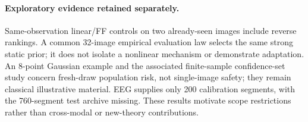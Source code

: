 \paragraph{Exploratory evidence retained separately.} Same-observation linear/FF controls on two already-seen images include reverse rankings. A common 32-image empirical evaluation law selects the same strong static prior; it does not isolate a nonlinear mechanism or demonstrate adaptation. An 8-point Gaussian example and the associated finite-sample confidence-set study concern fresh-draw population risk, not single-image safety; they remain classical illustrative material. EEG supplies only 200 calibration segments, with the 760-segment test archive missing. These results motivate scope restrictions rather than cross-modal or new-theory contributions.
